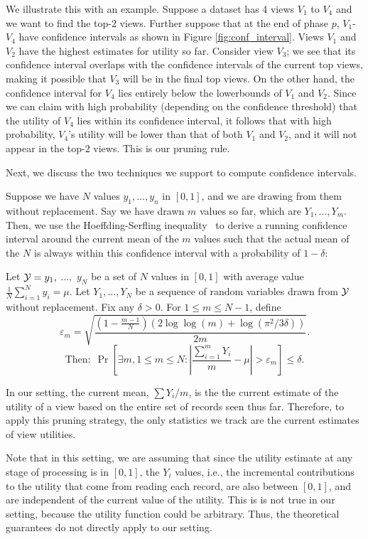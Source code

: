 We illustrate this with an example. Suppose a dataset has 4 views $V_1$
to $V_4$ and we want to find the top-$2$ views.
Further suppose that at the end of phase $p$,
$V_1$-$V_4$ have confidence intervals as shown in Figure \ref{fig:conf_interval}.
Views $V_1$ and $V_2$ have the highest estimates for utility so far.
Consider view $V_3$; we see that its confidence interval overlaps with the
confidence intervals of the current top views, making it possible
that $V_3$ will be in the final top views. On the other hand, the confidence
interval for $V_4$ lies entirely below the lowerbounds of $V_1$ and $V_2$.
Since we can claim with high probability (depending on the confidence threshold)
that the utility of $V_4$ lies within its confidence interval, it follows that
with high probability, $V_4$'s utility will be lower than that of both $V_1$ and
$V_2$, and it will not appear in the top-$2$ views.
This is our pruning rule. 

Next, we discuss the two techniques we support to compute confidence intervals.


Suppose we have $N$ values $y_1, \ldots, y_n$ in $[0, 1]$, and we are drawing
from them without replacement. 
Say we have drawn $m$ values so far, which are $Y_1, \ldots, Y_m$.
Then, we use the Hoeffding-Serfling inequality~\cite{serfling1974probability} 
to derive a running 
confidence interval around the current mean 
of the $m$ values such that the actual mean of the $N$
is always within this confidence interval with a probability of $1 - \delta$:
\begin{theorem}
\label{thm:hs}
Let $\mathcal{Y} = y_1,$ $\ldots,$ $y_N$ be a set of $N$ 
values in $[0,1]$ with average value
$\frac1N \sum_{i=1}^N y_i = \mu$.
Let $Y_1,\ldots,Y_N$ be a 
sequence of random variables drawn from $\mathcal{Y}$ without
replacement.
Fix any $\delta > 0$. For $1 \le m \le N-1$, define
$$
\varepsilon_m = \sqrt{\frac{(1-\frac{m-1}N)(2\log \log (m) + \log(\pi^2/3\delta))}{2m}}.
$$
$$
\textrm{Then:} \ \   \Pr\left[ \exists m, 1 \le m \le N : 
  \left|\frac{\sum_{i=1}^m Y_i}{m} - \mu\right| > \varepsilon_m \right] 
\le \delta.
$$
\end{theorem}
In our setting, the current mean, $\sum Y_i / m$, is the 
the current estimate of the utility of a view 
based on the entire set of records seen thus far. 
Therefore, to apply this pruning strategy, the only statistics
we track are the current estimates of view utilities.

Note that in this setting, we are assuming that since the
utility estimate at any stage of processing is in $[0, 1]$, 
the $Y_i$ values, i.e., the incremental contributions to the utility
that come from reading each record, are also between $[0, 1]$,
and are independent of the current value of the utility. 
This is is not true in our setting, 
because the utility function could be arbitrary.
Thus, the theoretical guarantees do not directly apply to our setting. 

